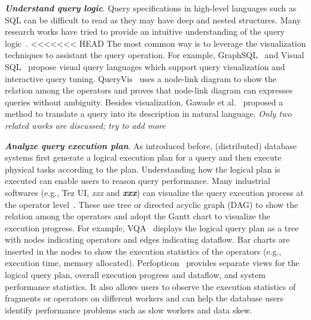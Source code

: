 \emph{\textbf{Understand query logic}}. Query specifications in high-level languages such as SQL can be difficult to read as they may have deep and nested structures. Many research works have tried to provide an intuitive understanding of the query logic~\cite{abouzied2012dataplay, gatterbauer2011databases, cerullo2007system,jaakkola2003visual,leventidis2020queryvis,danaparamita2011queryviz}. 
<<<<<<< HEAD
The most common way is to leverage the visualization techniques to assistant the query operation.
For example, GraphSQL~\cite{cerullo2007system} and Visual SQL~\cite{jaakkola2003visual} propose visual query languages which support query visualization and interactive query tuning.
QueryVis~\cite{leventidis2020queryvis} uses a node-link diagram to show the relation among the operators and proves that node-link diagram can expresses queries without ambiguity. Besides visualization, Gawade et al.~\cite{koutrika2010explaining} proposed a method to translate a query into its description in natural language. 
\textit{Only two related works are discussed; try to add more} 

\emph{\textbf{Analyze query execution plan}}. As introduced before, (distributed) database systems first generate a logical execution plan for a query and then execute physical tasks according to the plan. Understanding how the logical plan is executed can enable users to reason query performance. Many industrial softwares (e.g., Tez UI, \textit{xxx} and \textit{\textbf{xxx}}) can visualize the query execution process at the operator level~\cite{tez-ui}. These use tree or directed acyclic graph (DAG) to show the relation among the operators and adopt the Gantt chart to visualize the execution progress. For example, VQA~\cite{simitsis2014vqa} displays the logical query plan as a tree with nodes indicating operators and edges indicating dataflow. Bar charts are inserted in the nodes to show the execution statistics of the operators (e.g., execution time, memory allocated). Perfopticon~\cite{moritz2015perfopticon} provides separate views for the logical query plan, overall execution progress and dataflow, and system performance statistics. It also allows users to observe the execution statistics of fragments or operators on different workers and can help the database users identify performance problems such as slow workers and data skew. 

